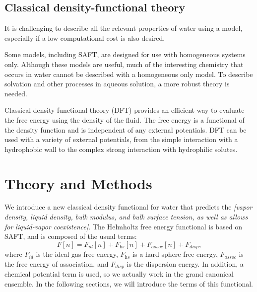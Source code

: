 \documentclass[letterpaper,twocolumn,amsmath,amssymb,prb]{revtex4-1}
\newcommand{\needsworklater}[1]{\emph{[#1]}}
\begin{document}
\subsection{Classical density-functional theory}

It is challenging to describe all the relevant properties of water using
a model, especially if a low computational cost is also desired.

Some models, including SAFT, are designed for use with
homogeneous systems only. Although these models are useful, much of the interesting
chemistry that occurs in water cannot be described with a homogeneous only model. To
describe solvation and other processes in aqueous solution, a more robust theory is 
needed.

Classical density-functional theory (DFT) provides an efficient way to evaluate the
free energy using the density of the fluid. The free energy is a functional of the 
density function and is independent of any external potentials\cite{ebner1976}. DFT 
can be used with a variety of external potentials, from the simple interaction with a 
hydrophobic wall to the complex strong interaction with hydrophilic solutes.

\section{Theory and Methods}
We introduce a new classical density functional for water that
predicts the \needsworklater{vapor density, liquid density, bulk
  modulus, and bulk surface tension, as well as allows for
  liquid-vapor coexistence}.  The Helmholtz free energy functional is
based on SAFT, and is composed of the usual terms:
\begin{equation}
  F[n] = F_\textit{id}[n] + F_\textit{hs}[n] + F_\textit{assoc}[n] +
F_\textit{disp},
\end{equation}
where $F_\textit{id}$ is the ideal gas free energy, $F_\textit{hs}$ is
a hard-sphere free energy, $F_\textit{assoc}$ is the free energy of
association, and $F_\textit{disp}$ is the dispersion energy.  In
addition, a chemical potential term is used, so we actually work in
the grand canonical ensemble.  In the following sections, we will
introduce the terms of this functional.
\end{document}
